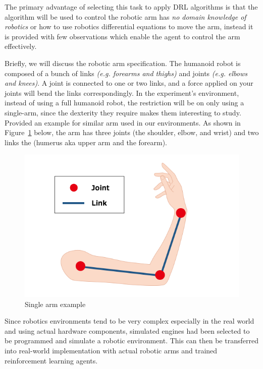 The primary advantage of selecting this task to apply DRL algorithms is that the algorithm will be used to control the robotic arm has \textit{no domain knowledge of robotics} or how to use robotics differential equations to move the arm, instead it is provided with few observations which enable the agent to control the arm effectively. 

Briefly, we will discuss the robotic arm specification. The humanoid robot is composed of a bunch of links \textit{(e.g. forearms and thighs)} and joints \textit{ (e.g. elbows and knees)}. A joint is connected to one or two links, and a force applied on your joints will bend the links correspondingly. In the experiment's environment, instead of using a full humanoid robot, the restriction will be on only using a single-arm, since the dexterity they require makes them interesting to study. Provided an example for similar arm used in our environments. As shown in Figure~\ref{fig:arm} below, the arm has three joints (the shoulder, elbow, and wrist) and two links the (humerus aka upper arm and the forearm).

\begin{figure}[!htb]
	\centering
	\includegraphics[width=\linewidth]{figures/arm.png}
	\caption{Single arm example}
	\label{fig:arm}
\end{figure}

Since robotics environments tend to be very complex especially in the real world and using actual hardware components, simulated engines had been selected to be programmed and simulate a robotic environment. This can then be transferred into real-world implementation with actual robotic arms and trained reinforcement learning agents. 

